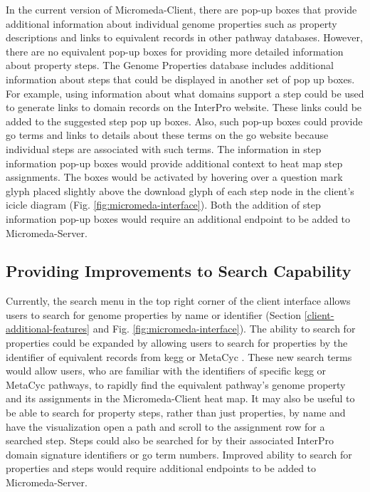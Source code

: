 In the current version of Micromeda-Client, there are pop-up boxes that provide 
additional information about individual genome properties such as property 
descriptions and links to equivalent records in other pathway databases. 
However, there are no equivalent pop-up boxes for providing more detailed 
information about property steps. The Genome Properties database includes 
additional information about steps that could be displayed in another set of pop 
up boxes. For example, using information about what domains support a step could 
be used to generate links to domain records on the InterPro website. These links 
could be added to the suggested step pop up boxes. Also, such pop-up boxes could 
provide \gls{go} terms and links to details about these terms on the \gls{go} 
website because individual steps are associated with such terms. The information 
in step information pop-up boxes would provide additional context to heat map 
step assignments. The boxes would be activated by hovering over a question mark 
glyph placed slightly above the download glyph of each step node in the client's 
icicle diagram (Fig. \ref{fig:micromeda-interface}). Both the addition of step 
information pop-up boxes would require an additional endpoint to be added to 
Micromeda-Server.

\subsection{Providing Improvements to Search Capability}

Currently, the search menu in the top right corner of the client interface 
allows users to search for genome properties by name or identifier (Section 
\ref{client-additional-features} and Fig. \ref{fig:micromeda-interface}). The 
ability to search for properties could be expanded by allowing users to search 
for properties by the identifier of equivalent records from \gls{kegg} 
\cite{kanehisa2000kegg} or MetaCyc \cite{karp2002metacyc}. These new search 
terms would allow users, who are familiar with the identifiers of specific 
\gls{kegg} or MetaCyc pathways, to rapidly find the equivalent pathway's genome 
property and its assignments in the Micromeda-Client heat map. It may also be 
useful to be able to search for property steps, rather than just properties, by 
name and have the visualization open a path and scroll to the assignment row for 
a searched step. Steps could also be searched for by their associated InterPro 
domain signature identifiers or \gls{go} term numbers. Improved ability to 
search for properties and steps would require additional endpoints to be added 
to Micromeda-Server.

